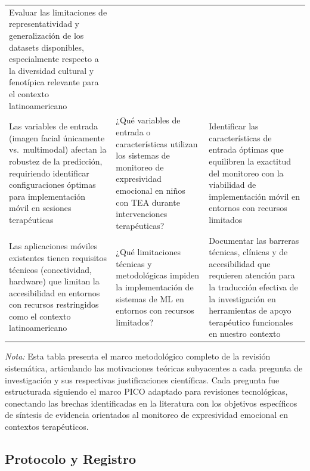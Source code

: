 \documentclass[ASNA,twocolumn]{USG}
\begin{document}
\begin{table}[!t]
{\begin{tabular*}{\textwidth}{@{\extracolsep\fill}lll@{\extracolsep\fill}}
				\parbox[t]{148pt}{Evaluar las limitaciones de representatividad y generalización de los datasets disponibles, especialmente respecto a la diversidad cultural y fenotípica relevante para el contexto latinoamericano} \\[6pt]
				\parbox[t]{148pt}{Las variables de entrada (imagen facial únicamente vs.\ multimodal) afectan la robustez de la predicción, requiriendo identificar configuraciones óptimas para implementación móvil en sesiones terapéuticas} &
				\parbox[t]{195pt}{¿Qué variables de entrada o características utilizan los sistemas de monitoreo de expresividad emocional en niños con TEA durante intervenciones terapéuticas?} &
				\parbox[t]{148pt}{Identificar las características de entrada óptimas que equilibren la exactitud del monitoreo con la viabilidad de implementación móvil en entornos con recursos limitados} \\[6pt]
				\parbox[t]{148pt}{Las aplicaciones móviles existentes tienen requisitos técnicos (conectividad, hardware) que limitan la accesibilidad en entornos con recursos restringidos como el contexto latinoamericano} &
				\parbox[t]{195pt}{¿Qué limitaciones técnicas y metodológicas impiden la implementación de sistemas de ML en entornos con recursos limitados?} &
				\parbox[t]{148pt}{Documentar las barreras técnicas, clínicas y de accesibilidad que requieren atención para la traducción efectiva de la investigación en herramientas de apoyo terapéutico funcionales en nuestro contexto} \\
				\bottomrule
		\end{tabular*}}
		\begin{tablenotes}
			\item {\it Nota:} Esta tabla presenta el marco metodológico completo de la revisión
			sistemática, articulando las motivaciones teóricas subyacentes a cada pregunta de
			investigación y sus respectivas justificaciones científicas. Cada pregunta fue
			estructurada siguiendo el marco PICO adaptado para revisiones tecnológicas,
			conectando las brechas identificadas en la literatura con los objetivos específicos
			de síntesis de evidencia orientados al monitoreo de expresividad emocional en
			contextos terapéuticos.
		\end{tablenotes}
	\end{table}
	
	\subsection{Protocolo y Registro}\label{sec2b}
	
\end{document}
